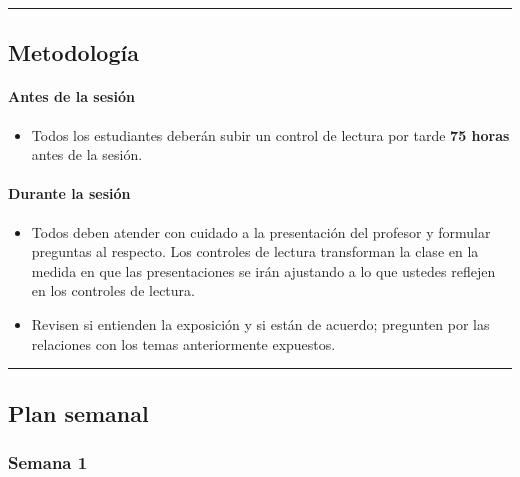 \documentclass[spanish,]{article}
\providecommand{\tightlist}{%
  \setlength{\itemsep}{0pt}\setlength{\parskip}{0pt}}
\let\oldparagraph\paragraph
\renewcommand{\paragraph}[1]{\oldparagraph{#1}\mbox{}}
\begin{document}
\begin{center}\rule{0.5\linewidth}{\linethickness}\end{center}

\subsection{Metodología}\label{metodologuxeda}

\paragraph{\texorpdfstring{\textbf{Antes de la
sesión}}{Antes de la sesión}}\label{antes-de-la-sesiuxf3n}

\begin{itemize}
\tightlist
\item
  Todos los estudiantes deberán subir un control de lectura por tarde
  \textbf{75 horas} antes de la sesión.
\end{itemize}

\paragraph{\texorpdfstring{\textbf{Durante la
sesión}}{Durante la sesión}}\label{durante-la-sesiuxf3n}

\begin{itemize}
\item
  Todos deben atender con cuidado a la presentación del profesor y
  formular preguntas al respecto. Los controles de lectura transforman
  la clase en la medida en que las presentaciones se irán ajustando a lo
  que ustedes reflejen en los controles de lectura.
\item
  Revisen si entienden la exposición y si están de acuerdo; pregunten
  por las relaciones con los temas anteriormente expuestos.
\end{itemize}

\begin{center}\rule{0.5\linewidth}{\linethickness}\end{center}

\subsection{Plan semanal}\label{plan-semanal}

\subsubsection{Semana 1}\label{semana-1}
\end{document}
